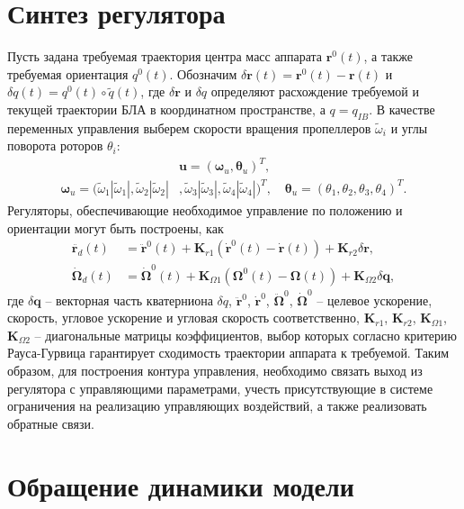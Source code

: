\section{Синтез регулятора}

Пусть задана требуемая траектория центра масс аппарата $\bm r^0(t)$, а также требуемая ориентация $q^0(t)$. Обозначим  $\delta \bm r(t) = \bm r^0(t) - \bm r(t)$ и $\delta q(t) = q^0(t) \circ \tilde q(t)$, где $\delta \bm r$ и $\delta q$ определяют расхождение требуемой и текущей траектории БЛА в координатном пространстве, а $q = q_{IB}$.  В качестве переменных управления выберем скорости вращения пропеллеров ${\tilde \omega}_i$ и углы поворота роторов ${\theta}_i$:
\begin{equation} \label{eq:m_ctrl_out}
\begin{aligned}
	&\bm{u} = (\bm \omega_u, \bm \theta_u)^T,
	\\
	\bm \omega_u =
	(\tilde\omega_1 |\tilde\omega_1|,
	\tilde\omega_2 |\tilde\omega_2|&,
	\tilde\omega_3 |\tilde\omega_3|,
	\tilde\omega_4 |\tilde\omega_4|)^T,
	\quad
	\bm \theta_u = (\theta_1, \theta_2 , \theta_3 , \theta_4 )^T.
\end{aligned}
\end{equation}
Регуляторы, обеспечивающие необходимое управление по положению и ориентации могут быть построены, как
\begin{equation} \label{eq:m_reg}
\begin{aligned}
	\ddot{\bm{r}_d}(t)&=
	\ddot{\bm{r}}^0(t)+\bm{K}_{r1}(\dot{\bm{r}}^0(t) - \dot{\bm{r}}(t))+\bm{K}_{r2}\delta \bm r,\\
	\dot{\bm{\Omega}}_d(t)&=
	\dot{\bm{\Omega}}^0(t)+\bm{K}_{\Omega1}(\bm{\Omega}^0(t)-\bm{\Omega}(t))+\bm{K}_{\Omega2}\delta\bm{q},
\end{aligned}
\end{equation}
где $\delta \bm q$ -- векторная часть кватерниона $\delta q$,
$\ddot{\bm{r}}^0$, $\dot{\bm{r}}^0$, $\ddot{\bm{\Omega}}^0$, $\dot{\bm{\Omega}}^0$ -- целевое ускорение, скорость, угловое ускорение и угловая скорость соответственно,
$\bm K_{r1}$, $\bm K_{r2}$, $\bm K_{\Omega1}$, $\bm K_{\Omega2}$ -- диагональные матрицы коэффициентов, выбор которых согласно критерию Рауса-Гурвица гарантирует сходимость траектории аппарата к требуемой. Таким образом, для построения
контура управления, необходимо связать выход из регулятора с управляющими
параметрами, учесть присутствующие в системе ограничения на реализацию
управляющих воздействий, а также реализовать обратные связи.

\section{Обращение динамики модели}
\label{section_dyn_inverse}

